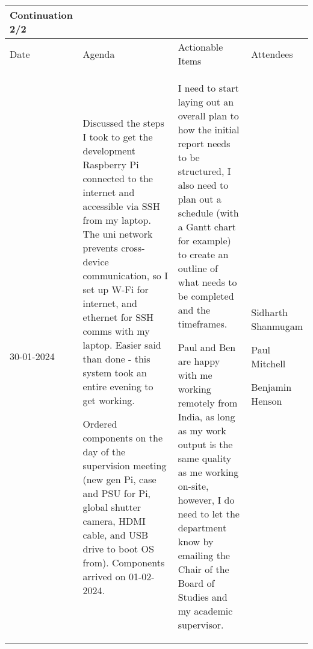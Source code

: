 \begin{table}[!h]
    \centering
    \begin{tabularx}{\textwidth}{|l|X|X|X|}
        \hline
        Continuation 2/2 \\
        \hline
        \hline
        Date & Agenda & Actionable Items & Attendees \\
        \hline
        \hline
        30-01-2024 & 
        \begin{myitemize}
            \item Discussed the steps I took to get the development Raspberry Pi connected to the internet and accessible via SSH from my laptop. The uni network prevents cross-device communication, so I set up W-Fi for internet, and ethernet for SSH comms with my laptop. Easier said than done - this system took an entire evening to get working.
            \item Ordered components on the day of the supervision meeting (new gen Pi, case and PSU for Pi, global shutter camera, HDMI cable, and USB drive to boot OS from). Components arrived on 01-02-2024.
        \end{myitemize} &
        \begin{myitemize}
            \item I need to start laying out an overall plan to how the initial report needs to be structured, I also need to plan out a schedule (with a Gantt chart for example) to create an outline of what needs to be completed and the timeframes.
            \item Paul and Ben are happy with me working remotely from India, as long as my work output is the same quality as me working on-site, however, I do need to let the department know by emailing the Chair of the Board of Studies and my academic supervisor.
        \end{myitemize} &
        \begin{myitemize}
            \item Sidharth Shanmugam
            \item Paul Mitchell
            \item Benjamin Henson
        \end{myitemize} \\
        \hline
    \end{tabularx}
\end{table}

